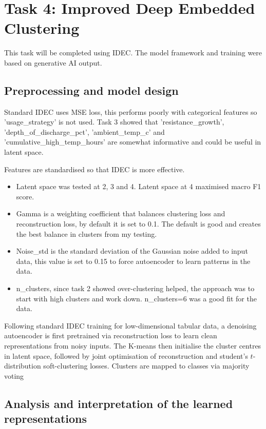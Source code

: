 \documentclass[12pt]{article}
\begin{document}
\section{Task 4: Improved Deep Embedded Clustering}

This task will be completed using IDEC. The model framework and training were based on generative AI output.

\subsection{Preprocessing and model design}

Standard IDEC uses MSE loss, this performs poorly with categorical features so 'usage_strategy' is not used. Task 3 showed that 'resistance_growth', 'depth_of_discharge_pct', 'ambient_temp_c' and 'cumulative_high_temp_hours' are somewhat informative and could be useful in latent space.

Features are standardised so that IDEC is more effective.

\begin{itemize}
    \item Latent space was tested at 2, 3 and 4. Latent space at 4 maximised macro F1 score.
    \item Gamma is a weighting coefficient that balances clustering loss and reconstruction loss, by default it is set to 0.1. The default is good and creates the best balance in clusters from my testing.
    \item Noise_std is the standard deviation of the Gaussian noise added to input data, this value is set to 0.15 to force autoencoder to learn patterns in the data.
    \item n_clusters, since task 2 showed over-clustering helped, the approach was to start with high clusters and work down. n_clusters=6 was a good fit for the data.
\end{itemize}

Following standard IDEC training for low-dimensional tabular data, a denoising autoencoder is first pretrained via reconstruction loss to learn clean representations from noisy inputs. The K-means then initialise the cluster centres in latent space, followed by joint optimisation of reconstruction and student's $t$-distribution soft-clustering losses. Clusters are mapped to classes via majority voting

\subsection{Analysis and interpretation of the learned representations}
\end{document}
